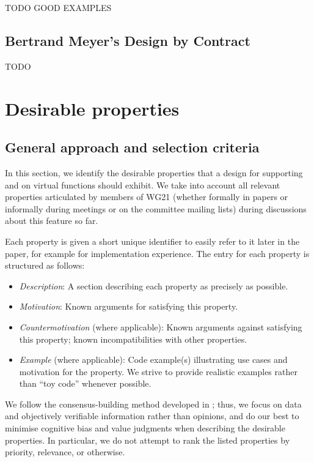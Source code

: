 TODO GOOD EXAMPLES

\subsection{Bertrand Meyer's Design by Contract}

TODO

\section{Desirable properties}
\label{properties}


\subsection{General approach and selection criteria}

In this section, we identify the desirable properties that a design for supporting  and  on virtual functions should exhibit. We take into account all relevant properties articulated by members of WG21 (whether formally in papers or informally during meetings or on the committee mailing lists)  during discussions about this feature so far.

Each property is given a short unique identifier to easily refer to it later in the paper, for example  for implementation experience. The entry for each property is structured as follows:
\begin{itemize}
\item \emph{Description}: A section describing each property as precisely as possible.
\item \emph{Motivation}: Known arguments for satisfying this property.
\item \emph{Countermotivation} (where applicable): Known arguments against satisfying this property; known incompatibilities with other properties.
\item \emph{Example} (where applicable): Code example(s) illustrating use cases and motivation for the property. We strive to provide realistic examples rather than ``toy code'' whenever possible. 
\end{itemize}
We follow the consensus-building method developed in \cite{P3850R0}; thus, we focus on data and objectively verifiable information rather than opinions, and do our best to minimise cognitive bias and value judgments when describing the desirable properties. In particular, we do not attempt to rank the listed properties by priority, relevance, or otherwise. 

